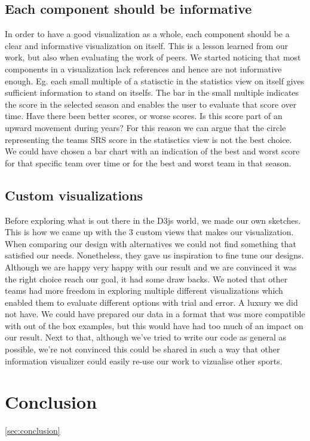 \documentclass{sigchi}
\begin{document}
\subsection{Each component should be informative}
In order to have a good visualization as a whole, each component should be a clear and 
informative visualization on itself. This is a lesson learned from our work, but also when
evaluating the work of peers. We started noticing that most components in a visualization 
lack references and hence are not informative enough. Eg. each small multiple of a statisctic
in the statistics view on itself gives sufficient information to stand on itselfs. The bar in
the small multiple indicates the score in the selected season and enables the user to evaluate
that score over time. Have there been better scores, or worse scores. Is this score part of 
an upward movement during years? 
For this reason we can argue that the circle representing the teams SRS score in the statisctics
view is not the best choice. We could have chosen a bar chart with an indication of the best and
worst score for that specific team over time or for the best and worst team in that season.

\subsection{Custom visualizations}
Before exploring what is out there in the D3js world, we made our own sketches. This is how
we came up with the 3 custom views that makes our visualization. When comparing our design 
with alternatives we could not find something that satisfied our needs. Nonetheless, they gave
us inspiration to fine tune our designs. Although we are happy very happy with our result and
we are convinced it was the right choice reach our goal, it had some draw backs.
We noted that other teams had more freedom in exploring multiple different visualizations which
enabled them to evaluate different options with trial and error. A luxury we did not have. We 
could have prepared our data in a format that was more compatible with out of the box examples,
but this would have had too much of an impact on our result.
Next to that, although we've tried to write our code as general as possible, we're not convinced
this could be shared in such a way that other information visualizer could easily re-use our work
to vizualise other sports.

\section{Conclusion}\ref{sec:conclusion}
\end{document}
